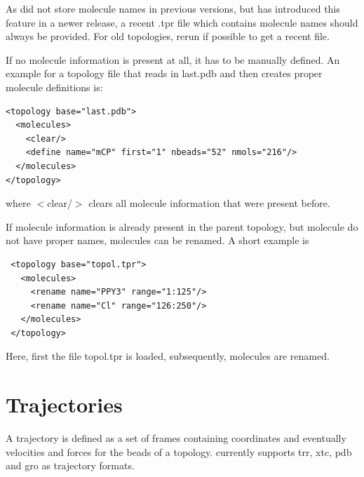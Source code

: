 As \gromacs did not store molecule names in previous versions, but has introduced this feature in a newer release,  a recent .tpr file which contains molecule names should always be provided. For old topologies, rerun \gromacs {} if possible to get a recent file.

If no molecule information is present at all, it has to be manually defined. An example for a topology file that reads in last.pdb and then creates proper molecule definitions is:
\begin{lstlisting}
<topology base="last.pdb">
  <molecules>
    <clear/>
    <define name="mCP" first="1" nbeads="52" nmols="216"/>
  </molecules>
</topology>
\end{lstlisting}
where $<$clear/$>$ clears all molecule information that were present before.

If molecule information is already present in the parent topology, but molecule do not have proper names, molecules can be renamed. A short example is
\begin{lstlisting}
 <topology base="topol.tpr">
   <molecules>
     <rename name="PPY3" range="1:125"/>
     <rename name="Cl" range="126:250"/>
   </molecules>
 </topology>
\end{lstlisting}
Here, first the file topol.tpr is loaded, subsequently, molecules are renamed.

\section{Trajectories}
A trajectory is defined as a set of frames containing coordinates and eventually velocities and forces for the beads of a topology.
\votca currently supports trr, xtc, pdb and gro as trajectory formats.






